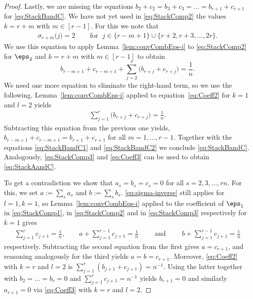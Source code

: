 \begin{proof}
	
Lastly, we are missing the equations $b_2 + c_2 = b_3 + c_3 = \ldots = b_{r+1} + c_{r+1}$  for \cref{eq:StackBandC}. We have not yet used in \cref{eq:StackComp2} the values $k = r + m$ with $m \in [r-1]$. For this we note that
\begin{align*}
	\sigma_{r + m} \big(j \big) =  2 \quad &\text{ for } \; j \in  \{r - m + 1\} \cup \{r + 2, r + 3, \dots, 2 r\}.
	\end{align*}
We use this equation to apply Lemma~\ref{lem:convCombEps-i} to \eqref{eq:StackComp2} for $\eps_2$ and $k=r + m$ with $m \in [r-1]$ to obtain 
$$ b_{r - m + 1} + c_{r - m +1} + \sum_{j=2}^{r} \big( b_{r + j} + c_{r + j} \big) = \frac{1}{n}.
$$
We need one more equation to eliminate the right-hand term, so we use the following. Lemma~\ref{lem:convCombEps-i} applied to 
equation~\eqref{eq:Coeff2} for $k=1$ and $l=2$ yields
	\begin{align*}
	\sum_{j=1}^r \big( b_{r + j} + c_{r + j} \big) = \frac{1}{n}.
	\end{align*}
Subtracting this equation from the previous one yields, $b_{r - m + 1} + c_{r - m +1} = b_{r+1} + c_{r + 1}$ for all $m = 1,\ldots,r-1$. Together with the equations \eqref{eq:StackBandC1} and \eqref{eq:StackBandC2} we conclude \cref{eq:StackBandC}. Analogously, \eqref{eq:StackComp3} and \eqref{eq:Coeff3} can be used to obtain
	\cref{eq:StackAandC}. 

To get a contradiction we show that $a_s = b_s = c_s = 0$ for all $s = 2,3,\ldots, r n$. For this, we set $a := \sum_{s} a_s$ and $b := \sum_s b_s$. \cref{eq:sigma-inverse} still applies for $l =1, k = 1$, so Lemma~\ref{lem:convCombEps-i} applied to the coefficient of $\eps_1$ in \eqref{eq:StackComp1}, in \eqref{eq:StackComp2} and in \eqref{eq:StackComp3} respectively for $k=1$ gives
	\begin{align*}
	\sum_{j=1}^{r} c_{j+1} = \frac{1}{n}, \qquad a + \sum_{j=1}^{r-1} c_{j+1} = \frac{1}{n} \qquad \text{ and } \qquad
	b + \sum_{j=1}^{r-1} c_{j+1} = \frac{1}{n}
	\end{align*}
respectively. Subtracting the second equation from the first gives $a=c_{r+1}$, and reasoning analogously for the third yields $a=b=c_{r+1}$. Moreover, \eqref{eq:Coeff2} with $k=r$ and $l=2$ is $\sum_{j=1}^r (b_{j+1} + c_{j+1}) = n^{-1}$. Using the latter together with $b_2 = \ldots = b_r = 0$ and $\sum_{j=1}^{r} c_{j+1} = n^{-1}$ yields $b_{r+1} = 0$ and similarly $a_{r+1} = 0$ via \eqref{eq:Coeff3} with $k=r$ and $l=2$.


\end{proof}
